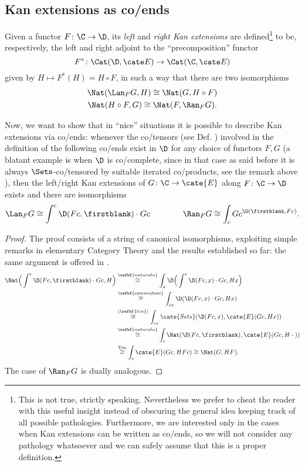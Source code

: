 \subsection{Kan extensions as co/ends}
\begin{definition}\label{kann}
Given a functor $F\colon \C\to \D$, its \emph{left} and \emph{right Kan extensions} are defined\footnote{This is not true, strictly speaking. Nevertheless we prefer to cheat the reader with this useful insight instead of obscuring the general idea keeping track of all possible pathologies. Furthermore, we are interested only in the cases when Kan extensions can be written as co/ends, so we will not consider any pathology whatsoever and we can safely assume that this is a proper definition.} to be, respectively, the left and right adjoint to the ``precomposition'' functor
\[
F^*\colon \Cat(\D,\cate E)\to \Cat(\C,\cate E)
\]
given by $H\mapsto F^*(H)=H\circ F$, in such a way that there are two  
isomorphisms
\begin{gather*}
\Nat(\Lan_FG,H)\cong \Nat(G, H\circ F)\\
\Nat(H\circ F,G)\cong \Nat(F, \Ran_FG).
\end{gather*}
\end{definition}
Now, we want to show that in ``nice'' situations it is possible to describe Kan extensions via co/ends: whenever the co/tensors (see Def. ) involved in the definition of the following co/ends exist in $\D$ for any choice of functors $F,G$ (a blatant example is when $\D$ is co/complete, since in that case as said before it is always $\Sets$-co/tensored by suitable iterated co/products, see the remark above ), then the left/right Kan extensions of $G\colon \C\to\cate{E}$ along $F\colon \C\to \D$ exists and there are isomorphisms
\[\label{kanend}
\Lan_FG\cong \int^c \D(Fc,\firstblank)\cdot Gc\qquad\qquad 
\Ran_FG\cong \int_c Gc^{\D(\firstblank,Fc)}.
\]
\begin{proof}
The proof consists of a string of canonical isomorphisms, exploiting simple remarks in elementary Category Theory and the results established so far: the same argument is offered in \cite[Thm\@. \textbf{X.4.1, 2}]{McL}.
\begin{align*}
\Nat\Big( \int^c \D(Fc,\firstblank)\cdot Gc,H\Big)&\overset{\refbf{naturalu}}{\cong} \int_x\D\Big( \int^c \D(Fc,x)\cdot Gc,Hx \Big)\\
&\overset{\refbf{commuhom}}{\cong} \int_{cx}\D(\D(Fc,x)\cdot Gc,Hx)\\
&\overset{(\refbf{ten})}{\cong} \int_{cx}\cate{Sets}(\D(Fc,x),\cate{E}(Gc,Hx))\\
&\overset{\refbf{naturalu}}{\cong}\int_c\Nat(\D(Fc,\firstblank),\cate{E}(Gc,H-))\\
&\overset{\text{Yon}}{\cong} \int_c \cate{E}(Gc,HFc)\cong\Nat(G,HF).
\end{align*}
The case of $\Ran_FG$ is dually analogous.
\end{proof}
